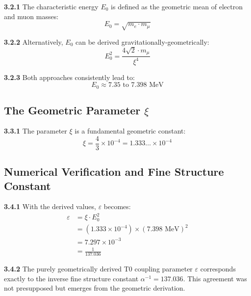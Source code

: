 \documentclass[12pt,a4paper]{article}
\newcommand{\Ezero}{E_0}
\newcommand{\xipar}{\xi}
\begin{document}
	\noindent \textbf{3.2.1} The characteristic energy $\Ezero$ is defined as the geometric mean of electron and muon masses:
	\begin{equation}
		\Ezero = \sqrt{m_e \cdot m_\mu}
		\label{eq:E0_geometric_mean}
	\end{equation}
	
	\noindent \textbf{3.2.2} Alternatively, $\Ezero$ can be derived gravitationally-geometrically:
	\begin{equation}
		\Ezero^2 = \frac{4\sqrt{2} \cdot m_\mu}{\xipar^4}
		\label{eq:E0_gravitational}
	\end{equation}
	
	\noindent \textbf{3.2.3} Both approaches consistently lead to:
	\begin{equation}
		\Ezero \approx 7.35 \text{ to } 7.398 \text{ MeV}
	\end{equation}
	
	\subsection{The Geometric Parameter $\xipar$}
	
	\noindent \textbf{3.3.1} The parameter $\xipar$ is a fundamental geometric constant:
	\begin{equation}
		\xipar = \frac{4}{3} \times 10^{-4} = 1.333\ldots \times 10^{-4}
		\label{eq:xi_value}
	\end{equation}
	
	\subsection{Numerical Verification and Fine Structure Constant}
	
	\noindent \textbf{3.4.1} With the derived values, $\varepsilon$ becomes:
	\begin{align}
		\varepsilon &= \xipar \cdot \Ezero^2 \\
		&= (1.333 \times 10^{-4}) \times (7.398 \text{ MeV})^2 \\
		&= 7.297 \times 10^{-3} \\
		&= \frac{1}{137.036}
		\label{eq:epsilon_numerical}
	\end{align}
	
	\begin{tcolorbox}[colback=blue!5!white,colframe=blue!75!black,title=Remarkable Agreement]
		\textbf{3.4.2} The purely geometrically derived T0 coupling parameter $\varepsilon$ corresponds exactly to the inverse fine structure constant $\alpha^{-1} = 137.036$. This agreement was not presupposed but emerges from the geometric derivation.
	\end{tcolorbox}
	
\end{document}
